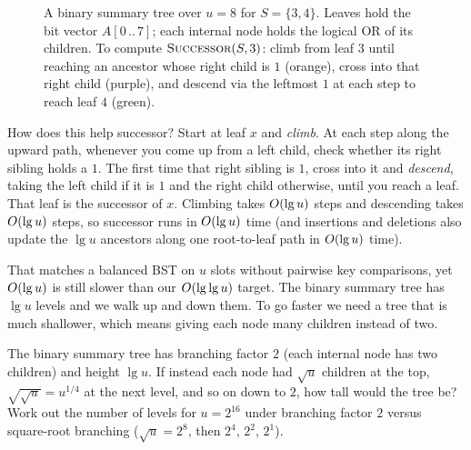 \begin{figure}[htbp]
\caption{A binary summary tree over $u=8$ for $S=\{3,4\}$. Leaves hold the bit
vector $A[0\,..\,7]$; each internal node holds the logical OR of its children. To compute $\textsc{Successor}(S, 3)$:
climb from leaf $3$ until reaching an ancestor whose right child is $1$ (orange), cross into that right child (purple), and descend via the leftmost $1$ at each step to reach leaf $4$ (green).}
\label{ch21:summary-tree}
\end{figure}

How does this help successor? Start at leaf $x$ and
\emph{climb}. At each step along the upward path, whenever you come up from a left child, check whether its right sibling holds a $1$. The first time that right sibling is $1$, cross into it and
\emph{descend}, taking the left child if it is $1$ and the right child otherwise, until you reach a
leaf. That leaf is the successor of $x$. Climbing takes $O(\lg u)$ steps and descending takes
$O(\lg u)$ steps, so successor runs in $O(\lg u)$ time (and insertions and deletions also update the $\lg u$ ancestors along one root-to-leaf path in $O(\lg u)$ time).

That matches a balanced BST on $u$ slots without pairwise key comparisons, yet
$O(\lg u)$ is still slower than our $O(\lg\lg u)$ target. The binary summary tree has
$\lg u$ levels and we walk up and down them. To go faster we need a tree that is
much shallower, which means giving each node many children instead of two.

\begin{walkbox}
The binary summary tree has branching
factor $2$ (each internal node has two children) and height $\lg u$. If instead each node had $\sqrt{u}$ children at the top, $\sqrt{\sqrt{u}} = u^{1/4}$ at the next level, and so on down to $2$,
how tall would the tree be? Work out the number of levels for $u = 2^{16}$ under branching
factor $2$ versus square-root branching ($\sqrt{u}=2^8$, then $2^4$, $2^2$, $2^1$).
\end{walkbox}

